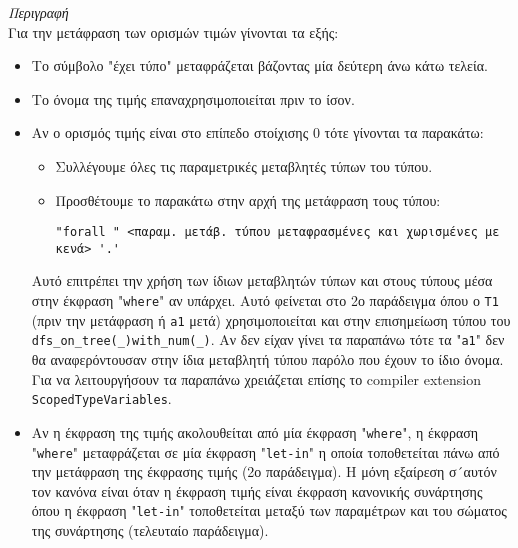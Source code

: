 \documentclass[diploma]{softlab-thesis}
\begin{document}
\begin{itemize}
\textit{Περιγραφή}\\

Για την μετάφραση των ορισμών τιμών γίνονται τα εξής:

\begin{itemize}
\item
Το σύμβολο "έχει τύπο" μεταφράζεται βάζοντας μία δεύτερη άνω κάτω τελεία.

\item
Το όνομα της τιμής επαναχρησιμοποιείται πριν το ίσον.

\item
Αν ο ορισμός τιμής είναι στο επίπεδο στοίχισης 0 τότε γίνονται τα παρακάτω:

\begin{itemize}
\item
Συλλέγουμε όλες τις παραμετρικές μεταβλητές τύπων του τύπου.
\item
Προσθέτουμε το παρακάτω στην αρχή της μετάφραση τους τύπου:
\begin{verbatim}
"forall " <παραμ. μετάβ. τύπου μεταφρασμένες και χωρισμένες με κενά> '.'
\end{verbatim}
\end{itemize}

Αυτό επιτρέπει την χρήση των ίδιων μεταβλητών τύπων και στους τύπους μέσα στην
έκφραση "\texttt{where}" αν υπάρχει. Αυτό φείνεται στο 2ο παράδειγμα όπου ο
\texttt{T1} (πριν την μετάφραση ή \texttt{a1} μετά) χρησιμοποιείται και στην
επισημείωση τύπου του \\ \verb|dfs_on_tree(_)with_num(_)|.  Αν δεν είχαν γίνει
τα παραπάνω τότε τα "\texttt{a1}" δεν θα αναφερόντουσαν στην ίδια μεταβλητή
τύπου παρόλο που έχουν το ίδιο όνομα. Για να λειτουργήσουν τα παραπάνω
χρειάζεται επίσης το compiler extension \texttt{ScopedTypeVariables}.

\item
Αν η έκφραση της τιμής ακολουθείται από μία έκφραση "\texttt{where}", η έκφραση
"\texttt{where}" μεταφράζεται σε μία έκφραση "\texttt{let-in}" η οποία
τοποθετείται πάνω από την μετάφραση της έκφρασης τιμής (2ο παράδειγμα).  Η μόνη
εξαίρεση σ´αυτόν τον κανόνα είναι όταν η έκφραση τιμής είναι έκφραση κανονικής
συνάρτησης όπου η έκφραση "\texttt{let-in}" τοποθετείται μεταξύ των παραμέτρων
και του σώματος της συνάρτησης (τελευταίο παράδειγμα).

\end{itemize}

\end{itemize}

\newpage
\end{document}
